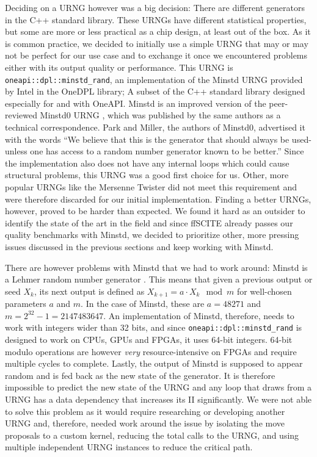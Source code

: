 Deciding on a \ac{URNG} however was a big decision: There are different generators in the C++ standard library. These \acp{URNG} have different statistical properties, but some are more or less practical as a chip design, at least out of the box. As it is common practice, we decided to initially use a simple \ac{URNG} that may or may not be perfect for our use case and to exchange it once we encountered problems either with its output quality or performance. This \ac{URNG} is \texttt{oneapi::dpl::minstd\_rand}, an implementation of the Minstd \ac{URNG} \cite{park1993remarks} provided by Intel in the OneDPL library; A subset of the C++ standard library designed especially for and with OneAPI. Minstd is an improved version of the peer-reviewed Minstd0 \ac{URNG} \cite{park1988random}, which was published by the same authors as a technical correspondence. Park and Miller, the authors of Minstd0, advertised it with the words ``We believe that this is the generator that should always be used- unless one has access to a random number generator known to be better.'' \cite{park1988random} Since the implementation also does not have any internal loops which could cause structural problems, this \ac{URNG} was a good first choice for us. Other, more popular \acp{URNG} like the Mersenne Twister \cite{matsumoto1998mersenne} did not meet this requirement and were therefore discarded for our initial implementation. Finding a better \acp{URNG}, however, proved to be harder than expected. We found it hard as an outsider to identify the state of the art in the field and since \ac{ffSCITE} already passes our quality benchmarks with Minstd, we decided to prioritize other, more pressing issues discussed in the previous sections and keep working with Minstd.

There are however problems with Minstd that we had to work around: Minstd is a Lehmer random number generator \cite{lehmer1951mathematical}. This means that given a previous output or seed $X_{k}$, its next output is defined as $X_{k+1} = a \cdot X_k \mod m$ for well-chosen parameters $a$ and $m$. In the case of Minstd, these are $a = 48271$ and $m = 2^{32} - 1 = 2147483647$. An implementation of Minstd, therefore, needs to work with integers wider than 32 bits, and since \texttt{oneapi::dpl::minstd\_rand} is designed to work on \acsp{CPU}, \acsp{GPU} and \acsp{FPGA}, it uses 64-bit integers. 64-bit modulo operations are however \emph{very} resource-intensive on \acp{FPGA} and require multiple cycles to complete. Lastly, the output of Minstd is supposed to appear random and is fed back as the new state of the generator. It is therefore impossible to predict the new state of the \ac{URNG} and any loop that draws from a \ac{URNG} has a data dependency that increases its \ac{II} significantly. We were not able to solve this problem as it would require researching or developing another \ac{URNG} and, therefore, needed work around the issue by isolating the move proposals to a custom kernel, reducing the total calls to the \ac{URNG}, and using multiple independent \ac{URNG} instances to reduce the critical path.